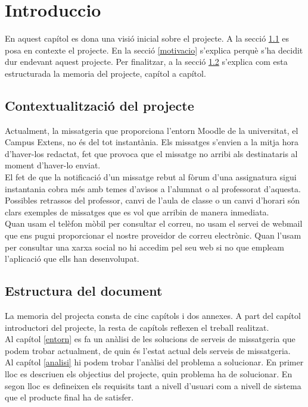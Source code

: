 \chapter{Introduccio}
En aquest capítol es dona una visió inicial sobre el projecte. A la secció \ref{contexte} es posa en contexte el projecte. En la secció \ref{motivacio} s'explica perquè s'ha decidit dur endevant aquest projecte. Per finalitzar, a la secció \ref{estructura_document} s'explica com esta estructurada la memoria del projecte, capítol a capítol.
\section{Contextualització del projecte}\label{contexte}
Actualment, la missatgeria que proporciona l'entorn Moodle de la universitat, el Campus Extens, no és del tot instantània. Els missatges s'envien a la mitja hora d'haver-los redactat, fet que provoca que el missatge no arribi als destinataris al moment d'haver-lo enviat. \\

El fet de que la notificació d'un missatge rebut al fòrum d'una assignatura sigui instantania cobra més amb temes d'avisos a l'alumnat o al professorat d'aquesta. Possibles retrassos del professor, canvi de l'aula de classe o un canvi d'horari són clars exemples de missatges que es vol que arribin de manera inmediata.\\

Quan usam el telèfon mòbil per consultar el correu, no usam el servei de webmail que ens pugui proporcionar el nostre proveidor de correu electrònic. Quan l'usam per consultar una xarxa social no hi accedim pel seu web si no que empleam l'aplicació que ells han desenvolupat. 

 
\section{Estructura del document}\label{estructura_document}
La memoria del projecta consta de cinc capítols i dos annexes. A part del capítol introductori del projecte, la resta de capítols reflexen el treball realitzat.\\

Al  capítol \ref{entorn} es fa un anàlisi de les solucions de serveis de missatgeria que podem trobar actualment, de quin és l'estat actual dels serveis de missatgeria.\\

Al capítol \ref{analisi} hi podem trobar l'anàlisi del problema a solucionar. En primer lloc es descriuen els objectius del projecte, quin problema ha de solucionar. En segon lloc es defineixen els requisits tant a nivell d'usuari com a nivell de sistema que el producte final ha de satisfer.\\

